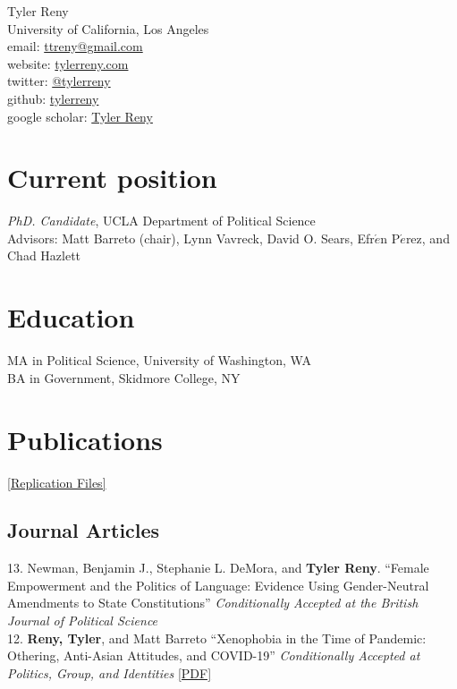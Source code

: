 \documentclass[11pt, a4paper]{article}
\newcommand{\years}[1]{\marginnote{\scriptsize #1}}
\begin{document}
{\LARGE Tyler Reny}\\[1cm]
 University of California, Los Angeles\\
email: \href{mailto:ttreny@gmail.com}{ttreny@gmail.com}\\
website: \href{http://www.tylerreny.com}{tylerreny.com}\\ 
twitter: \href{http://www.twitter.com/tylerreny}{@tylerreny}\\ 
github: \href{https://github.com/tylerreny}{tylerreny}\\ 
google scholar: \href{https://scholar.google.com/citations?user=KTbztQUAAAAJ&hl=en}{Tyler Reny}\\ 

\section*{Current position}
\emph{PhD. Candidate}, UCLA Department of Political Science\\
Advisors: Matt Barreto (chair), Lynn Vavreck, David O. Sears, Efr$\acute{e}$n P$\acute{e}$rez, and Chad Hazlett

\section*{Education}
\years{2015}\textsc{MA} in Political Science, University of Washington, WA\\
\years{2011}\textsc{BA} in Government, Skidmore College, NY

\section*{Publications}

\href{https://dataverse.harvard.edu/dataverse/tylerreny}{[Replication Files]}

\subsection*{Journal Articles}

\years{2020} 13. Newman, Benjamin J., Stephanie L. DeMora, and \textbf{Tyler Reny}. ``Female Empowerment and the Politics of Language: Evidence Using Gender-Neutral Amendments to State Constitutions'' \textit{Conditionally Accepted at the British Journal of Political Science}\\

\years{} 12. \textbf{Reny, Tyler}, and Matt Barreto ``Xenophobia in the Time of Pandemic: Othering, Anti-Asian Attitudes, and COVID-19'' \textit{Conditionally Accepted at Politics, Group, and Identities} \href{https://www.dropbox.com/s/3bniukgr62yu02m/Reny_Barreto_COVID_for_sharing.pdf?dl=0}{[PDF]} \\
\end{document}
